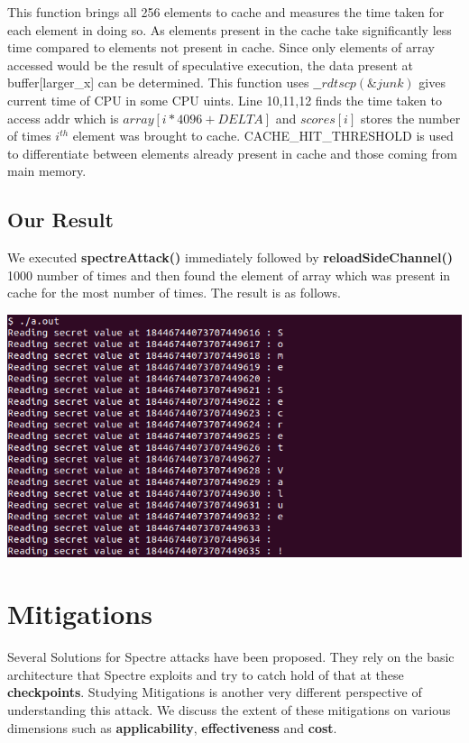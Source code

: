 \documentclass[12pt]{article}
\begin{document}
This function brings all 256 elements to cache and measures the time taken for each element in doing so. As elements present in the cache take significantly less time compared to elements not present in cache. Since only elements of array accessed would be the result of speculative execution, the data present at buffer[larger\_x] can be determined.
This function uses $\_\_rdtscp (\&junk)$ gives current time of CPU in some CPU uints.
Line 10,11,12 finds the time taken to access addr which is $array[i*4096+DELTA]$ and
$scores[i]$ stores the number of times $i^{th}$ element was brought to cache.
CACHE\_HIT\_THRESHOLD is used to differentiate between elements already present in cache and those coming from main memory.

  
\subsection{Our Result}

We executed \textbf{spectreAttack()} immediately followed by \textbf{reloadSideChannel()} 1000 number of times and then found the element of array which was present in cache for the most number of times. The result is as follows.

\vspace*{0.5 cm}
	{\centering
    \vspace*{0.5 cm}
\includegraphics[scale = 0.6]{spectre.png}\\[1.0 cm]}


\newpage
\section{Mitigations}
Several Solutions for Spectre attacks have been proposed. They rely on the basic architecture that Spectre exploits and try to catch hold of that at these \textbf{checkpoints}. Studying Mitigations is another very different perspective of understanding this attack. We discuss the extent of these mitigations on various dimensions such as \textbf{applicability}, \textbf{effectiveness} and \textbf{cost}.
\end{document}
